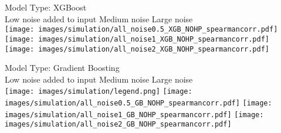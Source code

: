  \begin{figure*}[ht]
  \centering
  \scriptsize
    Model Type: XGBoost \\
        Low noise added to input \hspace{1cm} Medium noise \hspace{1.7cm} Large noise \\
    \hspace*{10ex}
    \texttt{[image: images/simulation/all\_noise0.5\_XGB\_NOHP\_spearmancorr.pdf]}
    \texttt{[image: images/simulation/all\_noise1\_XGB\_NOHP\_spearmancorr.pdf]}
    \texttt{[image: images/simulation/all\_noise2\_XGB\_NOHP\_spearmancorr.pdf]}
    
    Model Type: Gradient Boosting \\
        Low noise added to input \hspace{1cm} Medium noise \hspace{1.7cm} Large noise \\
      \texttt{[image: images/simulation/legend.png]}
    \texttt{[image: images/simulation/all\_noise0.5\_GB\_NOHP\_spearmancorr.pdf]}
    \texttt{[image: images/simulation/all\_noise1\_GB\_NOHP\_spearmancorr.pdf]}
    \texttt{[image: images/simulation/all\_noise2\_GB\_NOHP\_spearmancorr.pdf]}
    

\end{figure*}
